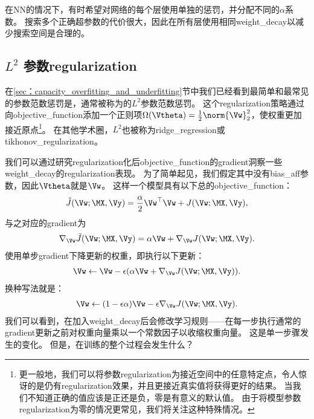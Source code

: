 在\gls{NN}的情况下，有时希望对网络的每个层使用单独的惩罚，并分配不同的$\alpha$系数。
搜索多个正确超参数的代价很大，因此在所有层使用相同\gls{weight_decay}以减少搜索空间是合理的。


\subsection{$L^2$ 参数\gls{regularization}}
\label{sec:l2_parameter_regularization}
在\ref{sec：capacity_overfitting_and_underfitting}节中我们已经看到最简单和最常见的参数范数惩罚是，通常被称为的$L^2$参数范数惩罚。
这个\gls{regularization}策略通过向\gls{objective_function}添加一个正则项$\Omega(\Vtheta) = \frac{1}{2} \norm{\Vw}_2^2$，使权重更加接近原点\footnote{更一般地，我们可以将参数\gls{regularization}为接近空间中的任意特定点，令人惊讶的是仍有\gls{regularization}效果，并且更接近真实值将获得更好的结果。
当我们不知道正确的值应该是正还是负，零是有意义的默认值。
由于将模型参数\gls{regularization}为零的情况更常见，我们将关注这种特殊情况。}。
在其他学术圈，$L^2$也被称为\gls{ridge_regression}或\gls{tikhonov_regularization}。

我们可以通过研究\gls{regularization}化后\gls{objective_function}的\gls{gradient}洞察一些\gls{weight_decay}的\gls{regularization}表现。
为了简单起见，我们假定其中没有\gls{bias_aff}参数，因此$\Vtheta$就是$\Vw$。
这样一个模型具有以下总的\gls{objective_function}：
\begin{align}
  \tilde{J}(\Vw;\MX, \Vy) =\frac{\alpha}{2} \Vw^\top \Vw +  J(\Vw;\MX, \Vy),
\end{align}
与之对应的\gls{gradient}为
\begin{align}
 \nabla_{\Vw} \tilde{J}(\Vw;\MX,\Vy) =\alpha \Vw +  \nabla_{\Vw} J(\Vw;\MX, \Vy).
\end{align}
使用单步\gls{gradient}下降更新的权重，即执行以下更新：
\begin{align}
 \Vw \leftarrow \Vw - \epsilon(\alpha \Vw + \nabla_{\Vw} J(\Vw;\MX, \Vy)).
\end{align}
换种写法就是：
\begin{align}
 \Vw \leftarrow (1-\epsilon \alpha)\Vw - \epsilon \nabla_{\Vw} J(\Vw;\MX, \Vy).
\end{align}
我们可以看到，在加入\gls{weight_decay}后会修改学习规则——在每一步执行通常的\gls{gradient}更新之前对权重向量乘以一个常数因子以收缩权重向量。
这是单一步骤发生的变化。
但是，在训练的整个过程会发生什么？


